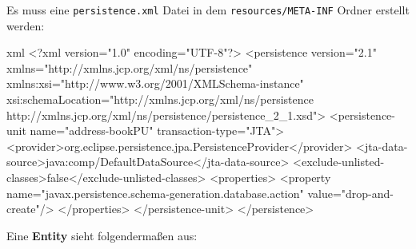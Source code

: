 
Es muss eine \texttt{persistence.xml} Datei in dem \texttt{resources/META-INF} Ordner erstellt werden:

\begin{code}{xml}
    <?xml version="1.0" encoding="UTF-8"?>
    <persistence version="2.1" xmlns="http://xmlns.jcp.org/xml/ns/persistence" xmlns:xsi="http://www.w3.org/2001/XMLSchema-instance" xsi:schemaLocation="http://xmlns.jcp.org/xml/ns/persistence http://xmlns.jcp.org/xml/ns/persistence/persistence_2_1.xsd">
      <persistence-unit name="address-bookPU" transaction-type="JTA">
        <provider>org.eclipse.persistence.jpa.PersistenceProvider</provider>
        <jta-data-source>java:comp/DefaultDataSource</jta-data-source>
        <exclude-unlisted-classes>false</exclude-unlisted-classes>
        <properties>
          <property name="javax.persistence.schema-generation.database.action" value="drop-and-create"/>
        </properties>
      </persistence-unit>
    </persistence>
\end{code}


Eine \textbf{Entity} sieht folgendermaßen aus:

